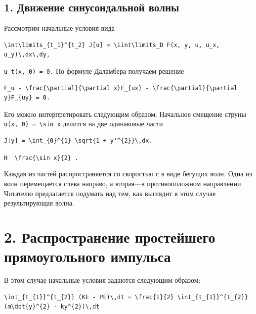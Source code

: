 \documentclass[
  ukrainian,
]{article}
\begin{document}
\subsection{1. Движение синусондальной
волны}\label{ux434ux432ux438ux436ux435ux43dux438ux435-ux441ux438ux43dux443ux441ux43eux43dux434ux430ux43bux44cux43dux43eux439-ux432ux43eux43bux43dux44b}

Рассмотрим начальные условия вида

\begin{verbatim}
\int\limits_{t_1}^{t_2} J[u] = \iint\limits_D F(x, y, u, u_x, u_y)\,dx\,dy,
\end{verbatim}

\texttt{u\_t(x,\ 0)\ =\ 0.} По формуле Даламбера получаем решение

\begin{verbatim}
F_u - \frac{\partial}{\partial x}F_{ux} - \frac{\partial}{\partial y}F_{uy} = 0.
\end{verbatim}

Его можно интерпретировать следующим образом. Начальное смещение струны
\texttt{u(x,\ 0)\ =\ \textbackslash{}sin\ x} делится на две одинаковые
части

\begin{verbatim}
J[y] = \int_{0}^{1} \sqrt{1 + y'^{2}}\,dx.
\end{verbatim}

\texttt{H\ \ \textquotesingle{}\textbackslash{}frac\{\textbackslash{}sin\ x\}\{2\}\textquotesingle{}\ .}

Каждая из частей распространяется со скоростью с в виде бегущих волн.
Одна из волн перемещается слева направо, а вторая---в противоположном
направлении. Читателю предлагается подумать над тем, как выглядит в этом
случае результирующая волна.

\section{2. Распространение простейшего прямоугольного
импульса}\label{ux440ux430ux441ux43fux440ux43eux441ux442ux440ux430ux43dux435ux43dux438ux435-ux43fux440ux43eux441ux442ux435ux439ux448ux435ux433ux43e-ux43fux440ux44fux43cux43eux443ux433ux43eux43bux44cux43dux43eux433ux43e-ux438ux43cux43fux443ux43bux44cux441ux430}

В этом случае начальные условия задаются следующим образом:

\begin{verbatim}
\int_{t_{1}}^{t_{2}} (KE - PE)\,dt = \frac{1}{2} \int_{t_{1}}^{t_{2}} (m\dot{y}^{2} - ky^{2})\,dt
\end{verbatim}
\end{document}
